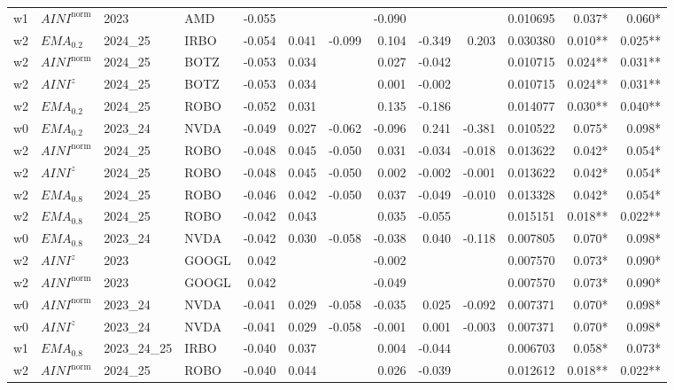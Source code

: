 \begin{longtable}{@{}llllrrrrrrrrr@{}}
w1 & $AINI^{\mathrm{norm}}$ & 2023 & AMD & -0.055 &  &  & -0.090 &  &  & 0.010695 & 0.037* & 0.060* \\
w2 & $EMA_{0.2}$ & 2024\_25 & IRBO & -0.054 & 0.041 & -0.099 & 0.104 & -0.349 & 0.203 & 0.030380 & 0.010** & 0.025** \\
w2 & $AINI^{\mathrm{norm}}$ & 2024\_25 & BOTZ & -0.053 & 0.034 &  & 0.027 & -0.042 &  & 0.010715 & 0.024** & 0.031** \\
w2 & $AINI^{z}$ & 2024\_25 & BOTZ & -0.053 & 0.034 &  & 0.001 & -0.002 &  & 0.010715 & 0.024** & 0.031** \\
w2 & $EMA_{0.2}$ & 2024\_25 & ROBO & -0.052 & 0.031 &  & 0.135 & -0.186 &  & 0.014077 & 0.030** & 0.040** \\
w0 & $EMA_{0.2}$ & 2023\_24 & NVDA & -0.049 & 0.027 & -0.062 & -0.096 & 0.241 & -0.381 & 0.010522 & 0.075* & 0.098* \\
w2 & $AINI^{\mathrm{norm}}$ & 2024\_25 & ROBO & -0.048 & 0.045 & -0.050 & 0.031 & -0.034 & -0.018 & 0.013622 & 0.042* & 0.054* \\
w2 & $AINI^{z}$ & 2024\_25 & ROBO & -0.048 & 0.045 & -0.050 & 0.002 & -0.002 & -0.001 & 0.013622 & 0.042* & 0.054* \\
w2 & $EMA_{0.8}$ & 2024\_25 & ROBO & -0.046 & 0.042 & -0.050 & 0.037 & -0.049 & -0.010 & 0.013328 & 0.042* & 0.054* \\
w2 & $EMA_{0.8}$ & 2024\_25 & ROBO & -0.042 & 0.043 &  & 0.035 & -0.055 &  & 0.015151 & 0.018** & 0.022** \\
w0 & $EMA_{0.8}$ & 2023\_24 & NVDA & -0.042 & 0.030 & -0.058 & -0.038 & 0.040 & -0.118 & 0.007805 & 0.070* & 0.098* \\
w2 & $AINI^{z}$ & 2023 & GOOGL & 0.042 &  &  & -0.002 &  &  & 0.007570 & 0.073* & 0.090* \\
w2 & $AINI^{\mathrm{norm}}$ & 2023 & GOOGL & 0.042 &  &  & -0.049 &  &  & 0.007570 & 0.073* & 0.090* \\
w0 & $AINI^{\mathrm{norm}}$ & 2023\_24 & NVDA & -0.041 & 0.029 & -0.058 & -0.035 & 0.025 & -0.092 & 0.007371 & 0.070* & 0.098* \\
w0 & $AINI^{z}$ & 2023\_24 & NVDA & -0.041 & 0.029 & -0.058 & -0.001 & 0.001 & -0.003 & 0.007371 & 0.070* & 0.098* \\
w1 & $EMA_{0.8}$ & 2023\_24\_25 & IRBO & -0.040 & 0.037 &  & 0.004 & -0.044 &  & 0.006703 & 0.058* & 0.073* \\
w2 & $AINI^{\mathrm{norm}}$ & 2024\_25 & ROBO & -0.040 & 0.044 &  & 0.026 & -0.039 &  & 0.012612 & 0.018** & 0.022** \\

\end{longtable}
